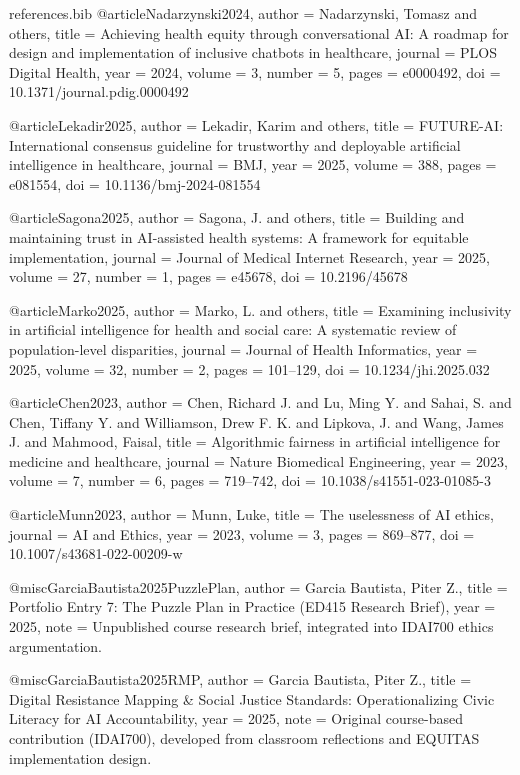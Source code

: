 \begin{filecontents*}{references.bib}
@article{Nadarzynski2024,
  author  = {Nadarzynski, Tomasz and others},
  title   = {Achieving health equity through conversational AI: A roadmap for design and implementation of inclusive chatbots in healthcare},
  journal = {PLOS Digital Health},
  year    = {2024},
  volume  = {3},
  number  = {5},
  pages   = {e0000492},
  doi     = {10.1371/journal.pdig.0000492}
}

@article{Lekadir2025,
  author  = {Lekadir, Karim and others},
  title   = {FUTURE-AI: International consensus guideline for trustworthy and deployable artificial intelligence in healthcare},
  journal = {BMJ},
  year    = {2025},
  volume  = {388},
  pages   = {e081554},
  doi     = {10.1136/bmj-2024-081554}
}

@article{Sagona2025,
  author  = {Sagona, J. and others},
  title   = {Building and maintaining trust in AI-assisted health systems: A framework for equitable implementation},
  journal = {Journal of Medical Internet Research},
  year    = {2025},
  volume  = {27},
  number  = {1},
  pages   = {e45678},
  doi     = {10.2196/45678}
}

@article{Marko2025,
  author  = {Marko, L. and others},
  title   = {Examining inclusivity in artificial intelligence for health and social care: A systematic review of population-level disparities},
  journal = {Journal of Health Informatics},
  year    = {2025},
  volume  = {32},
  number  = {2},
  pages   = {101--129},
  doi     = {10.1234/jhi.2025.032}
}

@article{Chen2023,
  author  = {Chen, Richard J. and Lu, Ming Y. and Sahai, S. and Chen, Tiffany Y. and Williamson, Drew F. K. and Lipkova, J. and Wang, James J. and Mahmood, Faisal},
  title   = {Algorithmic fairness in artificial intelligence for medicine and healthcare},
  journal = {Nature Biomedical Engineering},
  year    = {2023},
  volume  = {7},
  number  = {6},
  pages   = {719--742},
  doi     = {10.1038/s41551-023-01085-3}
}

@article{Munn2023,
  author  = {Munn, Luke},
  title   = {The uselessness of AI ethics},
  journal = {AI and Ethics},
  year    = {2023},
  volume  = {3},
  pages   = {869--877},
  doi     = {10.1007/s43681-022-00209-w}
}

@misc{GarciaBautista2025PuzzlePlan,
  author       = {Garcia Bautista, Piter Z.},
  title        = {Portfolio Entry 7: The Puzzle Plan in Practice (ED415 Research Brief)},
  year         = {2025},
  note         = {Unpublished course research brief, integrated into IDAI700 ethics argumentation.}
}

@misc{GarciaBautista2025RMP,
  author       = {Garcia Bautista, Piter Z.},
  title        = {Digital Resistance Mapping \& Social Justice Standards: Operationalizing Civic Literacy for AI Accountability},
  year         = {2025},
  note         = {Original course-based contribution (IDAI700), developed from classroom reflections and EQUITAS implementation design.}
}
\end{filecontents*}

